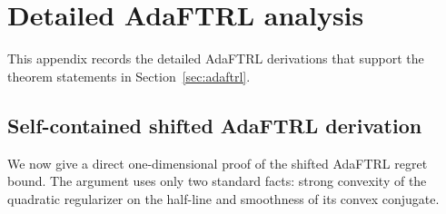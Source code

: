 \documentclass[11pt]{article}
\newcommand{\1}{\mathbf{1}}
\begin{document}
\section{Detailed AdaFTRL analysis}
\label{app:adaftrl-details}

This appendix records the detailed AdaFTRL derivations that support the theorem statements in Section~\ref{sec:adaftrl}.

\subsection{Self-contained shifted AdaFTRL derivation}

We now give a direct one-dimensional proof of the shifted AdaFTRL regret bound. The argument uses only two standard facts: strong convexity of the quadratic regularizer on the half-line and smoothness of its convex conjugate.
\end{document}
